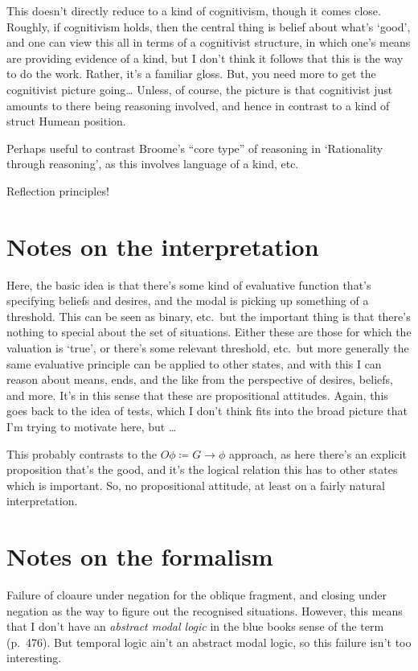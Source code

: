 \documentclass[10pt]{article}
\begin{document}
This doesn't directly reduce to a kind of cognitivism, though it comes close.
Roughly, if cognitivism holds, then the central thing is belief about what's `good', and one can view this all in terms of a cognitivist structure, in which one's means are providing evidence of a kind, but I don't think it follows that this is the way to do the work.
Rather, it's a familiar gloss.
But, you need more to get the cognitivist picture going\dots
Unless, of course, the picture is that cognitivist just amounts to there being reasoning involved, and hence in contrast to a kind of struct Humean position.

Perhaps useful to contrast Broome's ``core type'' of reasoning in `Rationality through reasoning', as this involves language of a kind, etc.

Reflection principles!


\section{Notes on the interpretation}
\label{sec:notes-interpretation}

Here, the basic idea is that there's some kind of evaluative function that's specifying beliefs and desires, and the modal is picking up something of a threshold.
This can be seen as binary, etc.\ but the important thing is that there's nothing to special about the set of situations.
Either these are those for which the valuation is `true', or there's some relevant threshold, etc.\ but more generally the same evaluative principle can be applied to other states, and with this I can reason about means, ends, and the like from the perspective of desires, beliefs, and more.
It's in this sense that these are propositional attitudes.
Again, this goes back to the idea of tests, which I don't think fits into the broad picture that I'm trying to motivate here, but \dots

This probably contrasts to the \(O\phi \coloneq G \rightarrow \phi\) approach, as here there's an explicit proposition that's the good, and it's the logical relation this has to other states which is important.
So, no propositional attitude, at least on a fairly natural interpretation.


\section{Notes on the formalism}
\label{sec:notes-formalism}

Failure of cloaure under negation for the oblique fragment, and closing under negation as the way to figure out the recognised situations.
However, this means that I don't have an \emph{abstract modal logic} in the blue books sense of the term (p.\  476).
But temporal logic ain't an abstract modal logic, so this failure isn't too interesting.
\end{document}
